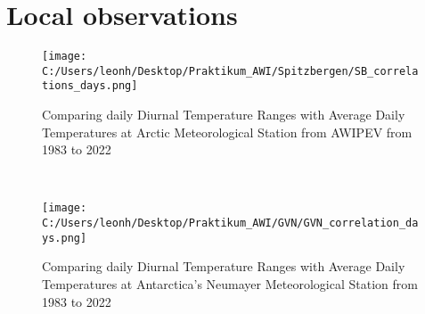 \clearpage
\section{Local observations}

\begin{figure}[h!]
    \centering
    \texttt{[image: C:/Users/leonh/Desktop/Praktikum\_AWI/Spitzbergen/SB\_correlations\_days.png]}
    \caption{Comparing daily Diurnal Temperature Ranges with Average Daily Temperatures at Arctic Meteorological Station from AWIPEV from 1983 to 2022}
    \label{fig:SB_DTR_days_scatterd}
\end{figure}\


\begin{figure}[h!]
    \centering
    \texttt{[image: C:/Users/leonh/Desktop/Praktikum\_AWI/GVN/GVN\_correlation\_days.png]}
    \caption{Comparing daily Diurnal Temperature Ranges with Average Daily Temperatures at Antarctica's Neumayer Meteorological Station from 1983 to 2022}
    \label{fig:GVN_DTR_days_scatterd}
\end{figure}\

